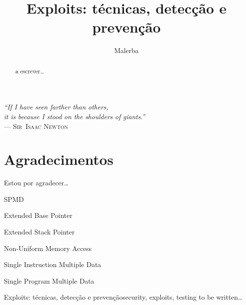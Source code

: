 \documentclass[t]{iiufrgs}
\title{Exploits: técnicas, detecção e prevenção}
\author{Malerba}{César}
\begin{document}
\maketitle

\clearpage
\begin{flushright}
\mbox{}\vfill
{\sffamily\itshape
``If I have seen farther than others,\\
it is because I stood on the shoulders of giants.''\\}
--- \textsc{Sir~Isaac Newton}
\end{flushright}

\chapter*{Agradecimentos}
Estou por agradecer\ldots

\tableofcontents

\begin{listofabbrv}{SPMD}
        \item[EBP] Extended Base Pointer
		\item[ESP] Extended Stack Pointer
        \item[NUMA] Non-Uniform Memory Access
        \item[SIMD] Single Instruction Multiple Data
        \item[SPMD] Single Program Multiple Data
\end{listofabbrv}


\listoffigures

\listoftables

\begin{abstract}
a escrever\ldots
\end{abstract}

\begin{englishabstract}{Exploits: técnicas, detecção e prevenção}{security, exploits, testing}
to be written\ldots
\end{englishabstract}









%
%


\end{document}
